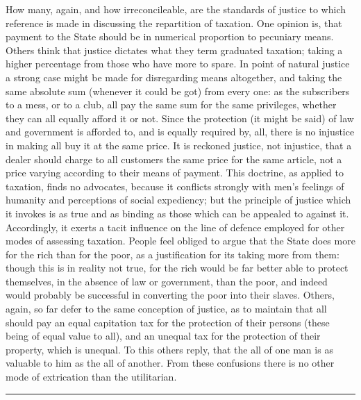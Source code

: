 \documentclass[12pt]{report}
\newcommand*{\xdash}[1][3em]{\rule[0.5ex]{#1}{0.55pt}}
\begin{document}
How many, again, and how irreconcileable, are the standards of justice to which reference is made in discussing the repartition of taxation. One opinion is, that payment to the State should be in numerical proportion to pecuniary means. Others think that justice dictates what they term graduated taxation; taking a higher percentage from those who have more to spare. In point of natural justice a strong case might be made for disregarding means altogether, and taking the same absolute sum (whenever it could be got) from every one: as the subscribers to a mess, or to a club, all pay the same sum for the same privileges, whether they can all equally afford it or not. Since the protection (it might be said) of law and government is afforded to, and is equally required by, all, there is no injustice in making all buy it at the same price. It is reckoned justice, not injustice, that a dealer should charge to all customers the same price for the same article, not a price varying according to their means of payment. This doctrine, as applied to taxation, finds no advocates, because it conflicts strongly with men's feelings of humanity and perceptions of social expediency; but the principle of justice which it invokes is as true and as binding as those which can be appealed to against it. Accordingly, it exerts a tacit influence on the line of defence employed for other modes of assessing taxation. People feel obliged to argue that the State does more for the rich than for the poor, as a justification for its taking more from them: though this is in reality not true, for the rich would be far better able to protect themselves, in the absence of law or government, than the poor, and indeed would probably be successful in converting the poor into their slaves. Others, again, so far defer to the same conception of justice, as to maintain that all should pay an equal capitation tax for the protection of their persons (these being of equal value to all), and an unequal tax for the protection of their property, which is unequal. To this others reply, that the all of one man is as valuable to him as the all of another. From these confusions there is no other mode of extrication than the utilitarian.

\begin{center}
\xdash[22em]
\end{center}
\end{document}
